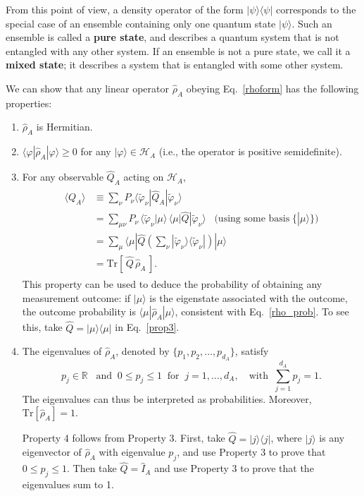 \documentclass[pra,12pt]{revtex4-2}
\begin{document}
From this point of view, a density operator of the form
$|\psi\rangle\langle\psi|$ corresponds to the special case of an
ensemble containing only one quantum state $|\psi\rangle$.  Such an
ensemble is called a \textbf{pure state}, and describes a quantum
system that is not entangled with any other system.  If an ensemble is
not a pure state, we call it a \textbf{mixed state}; it describes a
system that is entangled with some other system.

We can show that any linear operator $\hat{\rho}_A$ obeying
Eq.~\eqref{rhoform} has the following properties:
\begin{enumerate}
\item $\hat{\rho}_A$ is Hermitian.

\item $\langle\varphi|\hat{\rho}_A|\varphi\rangle \ge 0$ for any
  $|\varphi\rangle \in \mathscr{H}_A$ (i.e., the operator is positive
  semidefinite).

\item For any observable $\hat{Q}_A$ acting on $\mathscr{H}_A$,
  \begin{align}
    \begin{aligned}
      \langle Q_A \rangle
      &\equiv \sum_\nu P_\nu
      \langle \tilde{\varphi}_\nu|\hat{Q}_A|\tilde{\varphi}_\nu\rangle \\
      &= \sum_{\mu\nu} P_\nu\,
      \langle \tilde{\varphi}_\nu|\mu\rangle \,
      \langle\mu|\hat{Q}|\tilde{\varphi}_\nu\rangle
      \;\;\;\big(\textrm{using some basis} \;\{|\mu\rangle\}\big) \\
      &= \sum_\mu
      \langle\mu|\hat{Q} \left(\sum_\nu |\tilde{\varphi}_\nu\rangle
      \langle \tilde{\varphi}_\nu|\right) |\mu\rangle \\
      &= \mathrm{Tr}\left[\,\hat{Q} \,\hat{\rho}_A\,\right].
    \end{aligned}
    \label{prop3}
  \end{align}
  This property can be used to deduce the probability of obtaining any
  measurement outcome: if $|\mu\rangle$ is the eigenstate associated
  with the outcome, the outcome probability is
  $\langle\mu|\hat\rho_A|\mu\rangle$, consistent with
  Eq.~\eqref{rho_prob}.  To see this, take $\hat{Q} = |\mu\rangle
  \langle \mu|$ in Eq.~\eqref{prop3}.
  
\item The eigenvalues of $\hat{\rho}_A$, denoted by $\{p_1, p_2,
  \dots, p_{d_A}\}$, satisfy
  \begin{equation}
    p_j \in \mathbb{R} \;\;\;\mathrm{and}\;\; 0 \le p_j \le 1 \;\;
    \mathrm{for}\;\; j = 1,\dots,d_A,
    \quad\mathrm{with}\;\; \sum_{j=1}^{d_A} p_j = 1.
    \label{trrho_reduced}    
  \end{equation}
  The eigenvalues can thus be interpreted as probabilities.  Moreover,
  $\mathrm{Tr}[\hat\rho_A] = 1$.

  Property 4 follows from Property 3.  First, take $\hat{Q} =
  |j\rangle\langle j|$, where $|j\rangle$ is any eigenvector of
  $\hat\rho_A$ with eigenvalue $p_j$, and use Property 3 to prove that
  $0 \le p_j \le 1$.  Then take $\hat{Q} = \hat{I}_A$ and use Property
  3 to prove that the eigenvalues sum to 1.
\end{enumerate}
\end{document}

